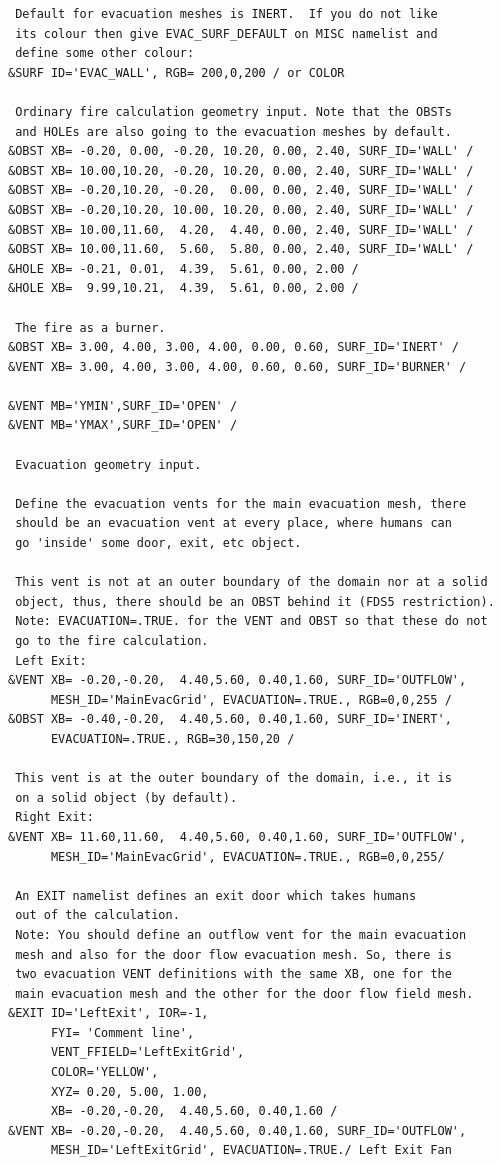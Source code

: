 \documentclass[12pt,a4paper,final,twoside]{stylevk}
\begin{document}
{\begin{verbatim}
 Default for evacuation meshes is INERT.  If you do not like
 its colour then give EVAC_SURF_DEFAULT on MISC namelist and
 define some other colour:
&SURF ID='EVAC_WALL', RGB= 200,0,200 / or COLOR

 Ordinary fire calculation geometry input. Note that the OBSTs
 and HOLEs are also going to the evacuation meshes by default.
&OBST XB= -0.20, 0.00, -0.20, 10.20, 0.00, 2.40, SURF_ID='WALL' /
&OBST XB= 10.00,10.20, -0.20, 10.20, 0.00, 2.40, SURF_ID='WALL' /
&OBST XB= -0.20,10.20, -0.20,  0.00, 0.00, 2.40, SURF_ID='WALL' /
&OBST XB= -0.20,10.20, 10.00, 10.20, 0.00, 2.40, SURF_ID='WALL' /
&OBST XB= 10.00,11.60,  4.20,  4.40, 0.00, 2.40, SURF_ID='WALL' /
&OBST XB= 10.00,11.60,  5.60,  5.80, 0.00, 2.40, SURF_ID='WALL' /
&HOLE XB= -0.21, 0.01,  4.39,  5.61, 0.00, 2.00 /
&HOLE XB=  9.99,10.21,  4.39,  5.61, 0.00, 2.00 /

 The fire as a burner.
&OBST XB= 3.00, 4.00, 3.00, 4.00, 0.00, 0.60, SURF_ID='INERT' /
&VENT XB= 3.00, 4.00, 3.00, 4.00, 0.60, 0.60, SURF_ID='BURNER' /

&VENT MB='YMIN',SURF_ID='OPEN' / 
&VENT MB='YMAX',SURF_ID='OPEN' / 

 Evacuation geometry input.

 Define the evacuation vents for the main evacuation mesh, there
 should be an evacuation vent at every place, where humans can
 go 'inside' some door, exit, etc object.
 
 This vent is not at an outer boundary of the domain nor at a solid
 object, thus, there should be an OBST behind it (FDS5 restriction).
 Note: EVACUATION=.TRUE. for the VENT and OBST so that these do not
 go to the fire calculation.
 Left Exit:
&VENT XB= -0.20,-0.20,  4.40,5.60, 0.40,1.60, SURF_ID='OUTFLOW', 
      MESH_ID='MainEvacGrid', EVACUATION=.TRUE., RGB=0,0,255 /
&OBST XB= -0.40,-0.20,  4.40,5.60, 0.40,1.60, SURF_ID='INERT', 
      EVACUATION=.TRUE., RGB=30,150,20 / 
 
 This vent is at the outer boundary of the domain, i.e., it is
 on a solid object (by default).
 Right Exit:
&VENT XB= 11.60,11.60,  4.40,5.60, 0.40,1.60, SURF_ID='OUTFLOW', 
      MESH_ID='MainEvacGrid', EVACUATION=.TRUE., RGB=0,0,255/

 An EXIT namelist defines an exit door which takes humans 
 out of the calculation.
 Note: You should define an outflow vent for the main evacuation
 mesh and also for the door flow evacuation mesh. So, there is
 two evacuation VENT definitions with the same XB, one for the
 main evacuation mesh and the other for the door flow field mesh.
&EXIT ID='LeftExit', IOR=-1,
      FYI= 'Comment line',
      VENT_FFIELD='LeftExitGrid',
      COLOR='YELLOW',
      XYZ= 0.20, 5.00, 1.00,
      XB= -0.20,-0.20,  4.40,5.60, 0.40,1.60 /
&VENT XB= -0.20,-0.20,  4.40,5.60, 0.40,1.60, SURF_ID='OUTFLOW', 
      MESH_ID='LeftExitGrid', EVACUATION=.TRUE./ Left Exit Fan


\end{verbatim}}
\end{document}
